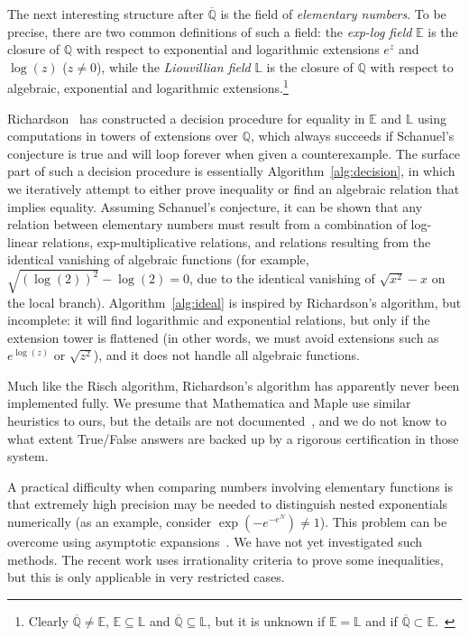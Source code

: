 \documentclass[11pt,a4paper]{article}
\begin{document}
The next interesting structure after $\overline{\mathbb{Q}}$
is the field of \emph{elementary numbers}.
To be precise, there are two common definitions of such a field:
the \emph{exp-log field} $\mathbb{E}$ is the closure of $\mathbb{Q}$
with respect to exponential and logarithmic extensions $e^z$ and $\log(z)$ ($z \ne 0$),
while the \emph{Liouvillian field} $\mathbb{L}$ is
the closure of $\mathbb{Q}$ with respect to algebraic,
exponential and logarithmic extensions.\footnote{Clearly $\overline{\mathbb{Q}} \ne \mathbb{E}$, $\mathbb{E} \subseteq \mathbb{L}$ and $\overline{\mathbb{Q}} \subseteq \mathbb{L}$,
but it is unknown if $\mathbb{E} = \mathbb{L}$ and if $\overline{\mathbb{Q}} \subset \mathbb{E}$.~\cite{Cho1999}}

Richardson~\cite{RF1994, Ric1992, Ric1995, Ric1997, Ric2007, Ric2009} has
constructed a decision procedure for equality in $\mathbb{E}$ and $\mathbb{L}$
using computations in towers of extensions over $\mathbb{Q}$,
which always succeeds
if Schanuel's conjecture is true
and will loop forever when given a counterexample.
The surface part of such a decision procedure is essentially Algorithm~\ref{alg:decision},
in which we iteratively attempt to either prove inequality
or find an algebraic relation that implies equality.
Assuming Schanuel's conjecture, it can be shown that any relation between
elementary numbers must result from a combination of
log-linear relations, exp-multiplicative relations,
and relations resulting from the identical
vanishing of algebraic functions (for example, $\sqrt{(\log(2))^2} - \log(2) = 0$,
due to the identical vanishing of $\sqrt{x^2}-x$ on the local branch).
Algorithm~\ref{alg:ideal} is inspired by Richardson's algorithm,
but incomplete: it will find logarithmic and exponential
relations, but only
if the extension tower is flattened
(in other words, we must avoid
extensions such as $e^{\log(z)}$ or $\sqrt{z^2}$),
and it does not handle all algebraic functions.

Much like the Risch algorithm,
Richardson's algorithm has apparently never been implemented fully.
We presume that Mathematica and Maple use similar
heuristics to ours, but the details
are not documented~\cite{Car2020}, and we do not know to what
extent True/False answers are backed up by a rigorous certification
in those system.

A practical difficulty when comparing numbers involving
elementary functions
is that extremely high precision may be needed
to distinguish nested exponentials numerically (as an
example, consider $\exp(-e^{-e^{N}}) \ne 1$).
This problem can be overcome using asymptotic expansions~\cite{vdH1995}.
We have not yet investigated such methods.
The recent work \cite{Boe2020} uses irrationality criteria
to prove some inequalities,
but this is only applicable in very restricted cases.
\end{document}
